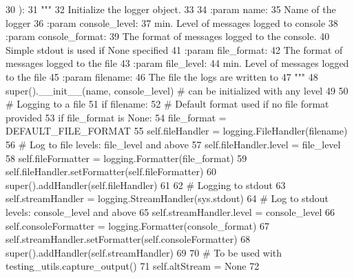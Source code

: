 \begin{DoxyCode}
30     ):
31         \textcolor{stringliteral}{"""}
32 \textcolor{stringliteral}{        Initialize the logger object.}
33 \textcolor{stringliteral}{}
34 \textcolor{stringliteral}{        :param name:}
35 \textcolor{stringliteral}{            Name of the logger}
36 \textcolor{stringliteral}{        :param console\_level:}
37 \textcolor{stringliteral}{            min. Level of messages logged to console}
38 \textcolor{stringliteral}{        :param console\_format:}
39 \textcolor{stringliteral}{            The format of messages logged to the console.}
40 \textcolor{stringliteral}{            Simple stdout is used if None specified}
41 \textcolor{stringliteral}{        :param file\_format:}
42 \textcolor{stringliteral}{            The format of messages logged to the file}
43 \textcolor{stringliteral}{        :param file\_level:}
44 \textcolor{stringliteral}{            min. Level of messages logged to the file}
45 \textcolor{stringliteral}{        :param filename:}
46 \textcolor{stringliteral}{            The file the logs are written to}
47 \textcolor{stringliteral}{        """}
48         super().\_\_init\_\_(name, console\_level)  \textcolor{comment}{# can be initialized with any level}
49 
50         \textcolor{comment}{# Logging to a file}
51         \textcolor{keywordflow}{if} filename:
52             \textcolor{comment}{# Default format used if no file format provided}
53             \textcolor{keywordflow}{if} file\_format \textcolor{keywordflow}{is} \textcolor{keywordtype}{None}:
54                 file\_format = DEFAULT\_FILE\_FORMAT
55             self.fileHandler = logging.FileHandler(filename)
56             \textcolor{comment}{# Log to file levels: file\_level and above}
57             self.fileHandler.level = file\_level
58             self.fileFormatter = logging.Formatter(file\_format)
59             self.fileHandler.setFormatter(self.fileFormatter)
60             super().addHandler(self.fileHandler)
61 
62         \textcolor{comment}{# Logging to stdout}
63         self.streamHandler = logging.StreamHandler(sys.stdout)
64         \textcolor{comment}{# Log to stdout levels: console\_level and above}
65         self.streamHandler.level = console\_level
66         self.consoleFormatter = logging.Formatter(console\_format)
67         self.streamHandler.setFormatter(self.consoleFormatter)
68         super().addHandler(self.streamHandler)
69 
70         \textcolor{comment}{# To be used with testing\_utils.capture\_output()}
71         self.altStream = \textcolor{keywordtype}{None}
72 
\end{DoxyCode}


